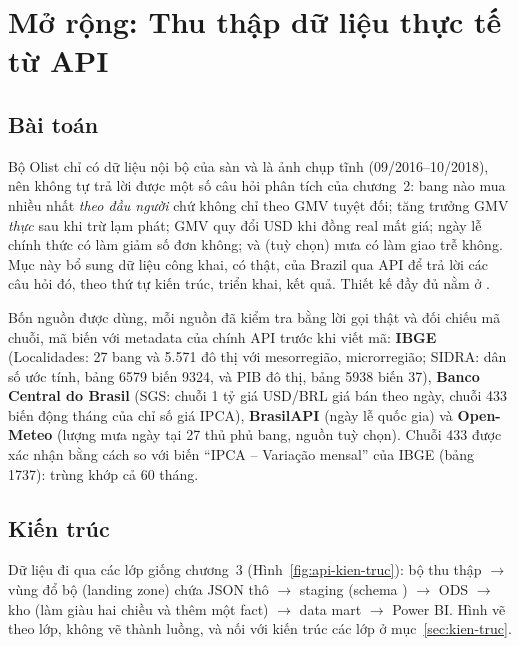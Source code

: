 \section{Mở rộng: Thu thập dữ liệu thực tế từ API}\label{sec:api}
\subsection{Bài toán}\label{sec:api-bai-toan}
Bộ Olist chỉ có dữ liệu nội bộ của sàn và là ảnh chụp tĩnh (09/2016--10/2018), nên không tự trả lời được một số câu hỏi phân tích của chương~2: bang nào mua nhiều nhất \emph{theo đầu người} chứ không chỉ theo GMV tuyệt đối; tăng trưởng GMV \emph{thực} sau khi trừ lạm phát; GMV quy đổi USD khi đồng real mất giá; ngày lễ chính thức có làm giảm số đơn không; và (tuỳ chọn) mưa có làm giao trễ không. Mục này bổ sung dữ liệu công khai, có thật, của Brazil qua API để trả lời các câu hỏi đó, theo thứ tự kiến trúc, triển khai, kết quả. Thiết kế đầy đủ nằm ở .

Bốn nguồn được dùng, mỗi nguồn đã kiểm tra bằng lời gọi thật và đối chiếu mã chuỗi, mã biến với metadata của chính API trước khi viết mã: \textbf{IBGE} (Localidades: 27 bang và 5.571 đô thị với mesorregião, microrregião; SIDRA: dân số ước tính, bảng 6579 biến 9324, và PIB đô thị, bảng 5938 biến 37), \textbf{Banco Central do Brasil} (SGS: chuỗi 1 tỷ giá USD/BRL giá bán theo ngày, chuỗi 433 biến động tháng của chỉ số giá IPCA), \textbf{BrasilAPI} (ngày lễ quốc gia) và \textbf{Open-Meteo} (lượng mưa ngày tại 27 thủ phủ bang, nguồn tuỳ chọn). Chuỗi 433 được xác nhận bằng cách so với biến ``IPCA -- Variação mensal'' của IBGE (bảng 1737): trùng khớp cả 60 tháng.

\subsection{Kiến trúc}\label{sec:api-kien-truc}
Dữ liệu đi qua các lớp giống chương~3 (Hình~\ref{fig:api-kien-truc}): bộ thu thập $\rightarrow$ vùng đổ bộ (landing zone) chứa JSON thô $\rightarrow$ staging (schema ) $\rightarrow$ ODS $\rightarrow$ kho (làm giàu hai chiều và thêm một fact) $\rightarrow$ data mart $\rightarrow$ Power BI. Hình vẽ theo lớp, không vẽ thành luồng, và nối với kiến trúc các lớp ở mục~\ref{sec:kien-truc}.

